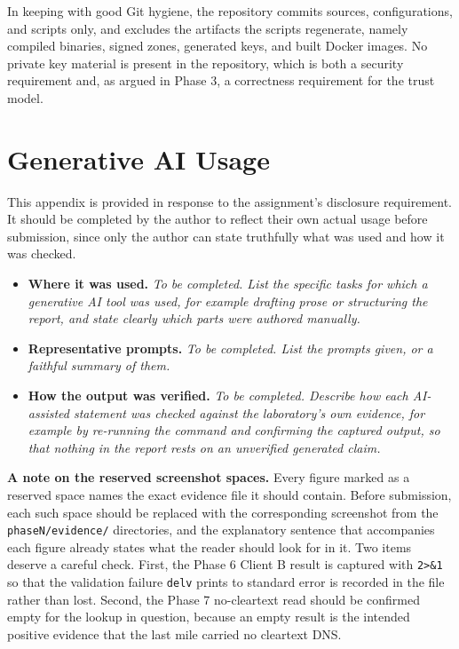 \documentclass[11pt]{article}
\begin{document}
In keeping with good Git hygiene, the repository commits sources, configurations,
and scripts only, and excludes the artifacts the scripts regenerate, namely
compiled binaries, signed zones, generated keys, and built Docker images. No private
key material is present in the repository, which is both a security requirement and,
as argued in Phase 3, a correctness requirement for the trust model.

\section{Generative AI Usage}

This appendix is provided in response to the assignment's disclosure requirement. It
should be completed by the author to reflect their own actual usage before
submission, since only the author can state truthfully what was used and how it was
checked.

\begin{itemize}[leftmargin=1.4em]
\item \textbf{Where it was used.} \textit{To be completed. List the specific tasks for which a generative AI tool was used, for example drafting prose or structuring the report, and state clearly which parts were authored manually.}
\item \textbf{Representative prompts.} \textit{To be completed. List the prompts given, or a faithful summary of them.}
\item \textbf{How the output was verified.} \textit{To be completed. Describe how each AI-assisted statement was checked against the laboratory's own evidence, for example by re-running the command and confirming the captured output, so that nothing in the report rests on an unverified generated claim.}
\end{itemize}

\textbf{A note on the reserved screenshot spaces.} Every figure marked as a reserved
space names the exact evidence file it should contain. Before submission, each such
space should be replaced with the corresponding screenshot from the
\texttt{phaseN/evidence/} directories, and the explanatory sentence that accompanies
each figure already states what the reader should look for in it. Two items deserve
a careful check. First, the Phase 6 Client B result is captured with \texttt{2>\&1}
so that the validation failure \texttt{delv} prints to standard error is recorded in
the file rather than lost. Second, the Phase 7 no-cleartext read should be confirmed
empty for the lookup in question, because an empty result is the intended positive
evidence that the last mile carried no cleartext DNS.
\end{document}
